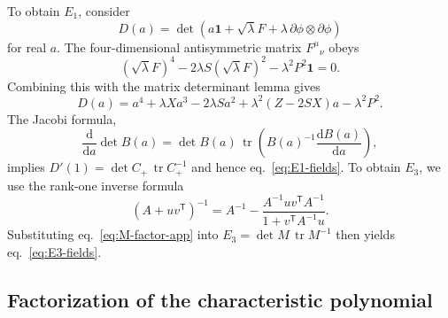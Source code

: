 \documentclass[a4paper,11pt]{article}
\numberwithin{equation}{section}
\newcommand{\dd}{\mathrm d}
\newcommand{\tr}{\operatorname{tr}}
\newcommand{\Id}{\mathbf 1}
\begin{document}
To obtain $E_1$, consider
\begin{equation}
 D(a)=\det\!\left(a\Id+\sqrt\lambda F
 +\lambda\,\partial\phi\otimes\partial\phi\right)
 \label{eq:Da-app}
\end{equation}
for real $a$. The four-dimensional antisymmetric matrix $F^\mu{}_{\nu}$ obeys
\begin{equation}
 (\sqrt\lambda F)^4-2\lambda S(\sqrt\lambda F)^2-\lambda^2P^2\Id=0.
 \label{eq:F-CH-app}
\end{equation}
Combining this with the matrix determinant lemma gives
\begin{equation}
 D(a)=a^4+\lambda Xa^3-2\lambda Sa^2
 +\lambda^2(Z-2SX)a-\lambda^2P^2.
 \label{eq:D-polynomial-app}
\end{equation}
The Jacobi formula,
\begin{equation}
 \frac{\dd}{\dd a}\det B(a)
 =\det B(a)\,\tr\!\left(B(a)^{-1}\frac{\dd B(a)}{\dd a}\right),
 \label{eq:jacobi-app}
\end{equation}
implies $D'(1)=\det C_+\,\tr C_+^{-1}$ and hence eq.~\eqref{eq:E1-fields}. To obtain $E_3$, we use the rank-one inverse formula
\begin{equation}
 (A+uv^{\mathsf T})^{-1}
 =A^{-1}-\frac{A^{-1}uv^{\mathsf T}A^{-1}}
 {1+v^{\mathsf T}A^{-1}u}.
 \label{eq:sherman-morrison-app}
\end{equation}
Substituting eq.~\eqref{eq:M-factor-app} into $E_3=\det M\,\tr M^{-1}$ then yields eq.~\eqref{eq:E3-fields}.

\subsection{Factorization of the characteristic polynomial}
\end{document}
